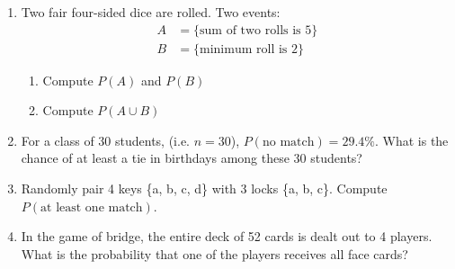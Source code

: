\documentclass[11pt]{article}
\begin{document}
\begin{enumerate}
    \item Two fair four-sided dice are rolled. Two events:
\vspace{-0.4cm}
\begin{align*}
A & = \{ \text{sum of two rolls is 5} \}\\
B & = \{ \text{minimum roll is 2} \}
\end{align*}
\vspace{-0.8cm}
\begin{enumerate}
\item Compute $P(A)$ and $P(B)$
\item Compute $P(A \cup B)$
\end{enumerate}

    \item For a class of 30 students, (i.e. $n = 30$), $P(\text{no match}) = 29.4\%$.
What is the chance of at least a tie in birthdays among these 30 students?

    \item Randomly pair 4 keys \{a, b, c, d\} with 3 locks \{a, b, c\}. Compute $P(\text{at least one match})$.
    
    \item In the game of bridge, the entire deck of 52 cards is dealt out to 4 players. What is the probability that one of the players receives all face cards?
\end{enumerate}
\end{document}
